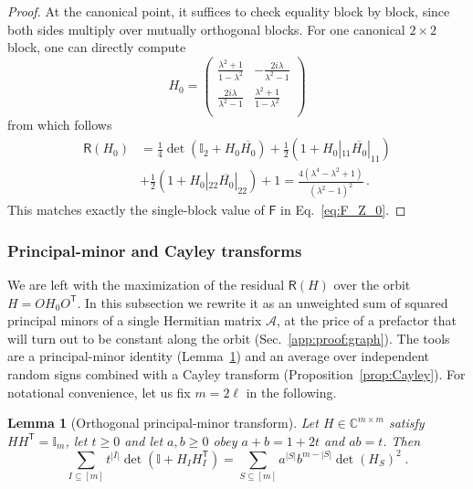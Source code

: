 \documentclass[prx,twocolumn,superscriptaddress,aps,10pt, frontmatterverbose, reprint,footinbib,longbibliography=true]{revtex4-2}
\newtheorem{lemma}{Lemma}
\newcommand{\trans}{\mathsf{T}}
\providecommand{\DIFaddtex}[1]{{\protect\color{red}#1}} %
\providecommand{\DIFaddbegin}{\protect\color{red}} %
\providecommand{\DIFaddend}{\protect\color{black}} %
\providecommand{\DIFaddtex}[1]{\texorpdfstring{\DIFaddtex{#1}}{#1}} %
\providecommand{\DIFadd}[1]{\texorpdfstring{\DIFaddtex{#1}}{#1}} %
\newcommand{\DIFaddincludegraphics}[2][]{{\color{blue}\fbox{\DIFOincludegraphics[#1]{#2}}}} %
\DeclareRobustCommand{\DIFaddbegin}{\DIFOaddbegin \let\includegraphics\DIFaddincludegraphics} %
\DeclareRobustCommand{\DIFaddend}{\DIFOaddend \let\includegraphics\DIFOincludegraphics} %
\begin{document}
\begin{proof}
At the canonical point, it suffices to check equality block by block, since both sides multiply over mutually orthogonal blocks. For one canonical $2\times2$ block, one can directly compute
\begin{equation}
    H_0= \left(
\begin{array}{cc}
 \frac{\lambda ^2+1}{1-\lambda ^2} & -\frac{2 i \lambda }{\lambda ^2-1} \\
 \frac{2 i \lambda }{\lambda ^2-1} & \frac{\lambda ^2+1}{1-\lambda ^2} \\
\end{array}
\right)
\end{equation}
from which follows
\begin{equation}
\begin{split}
    \mathsf{R}(H_0)&= \frac{1}{4} \det(\mathbb{I}_2+ H_0\overline{H_0}) + \frac{1}{2} (1+ H_0|_{11} \overline{H_0} |_{11} ) \\
    &+ \frac{1}{2} (1+ H_0|_{22} \overline{H_0} |_{22} ) + 1= \frac{4 \left(\lambda ^4-\lambda ^2+1\right)}{\left(\lambda ^2-1\right)^2}\,.
\end{split}
\end{equation}
This matches exactly the single-block value of $\mathsf{F}$ in Eq.~\eqref{eq:F_Z_0}.
\end{proof}
\subsubsection{Principal-minor and Cayley transforms}
\label{app:proof:cayley}

We are left with the maximization of the residual $\mathsf{R}(H)$ over the orbit $H=OH_0O^{\trans}$. In this subsection we rewrite it as an unweighted sum of squared principal minors of a single Hermitian matrix $\mathcal{A}$, at the price of a prefactor that will turn out to be constant along the orbit (Sec.~\ref{app:proof:graph}). The \DIFaddbegin \DIFadd{tools are a principal-minor identity (Lemma~\ref{lem:PMT}) and an }\DIFaddend average over independent random signs \DIFaddbegin \DIFadd{combined with a Cayley transform (Proposition~\ref{prop:Cayley})}\DIFaddend .
For notational convenience, let us fix $m=2\ell$ in the following. 
\begin{lemma}[Orthogonal principal-minor transform]
\label{lem:PMT}
Let $H\in\mathbb{C}^{m\times m}$ satisfy $HH^{\trans}=\mathbb{I}_m$, let $t\ge0$ and let $a,b\ge0$ obey $a+b=1+2t$ and $ab=t$. Then
\begin{equation}
    \sum_{I\subseteq[m]}t^{|I|}\det\!\left(\mathbb{I}+H_IH_I^{\trans}\right)=\sum_{S\subseteq[m]}a^{|S|}b^{m-|S|}\det(H_S)^2\;.
    \label{eq:PMT}
\end{equation}
\end{lemma}
\end{document}
